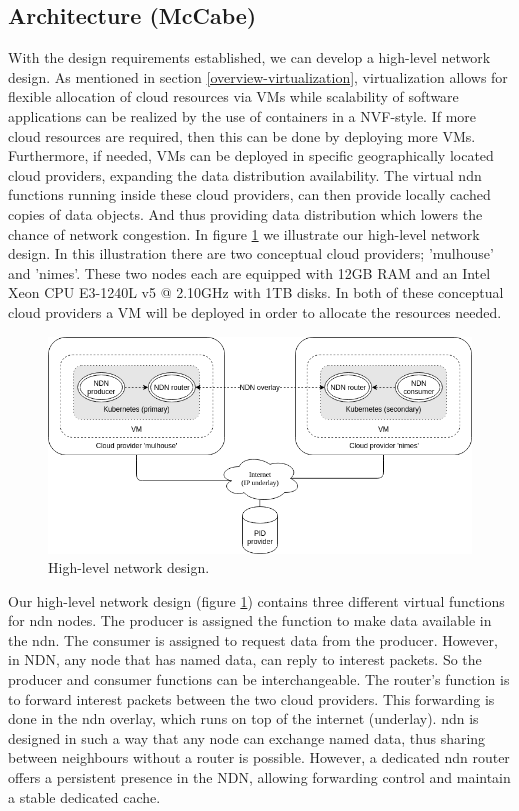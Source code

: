 \subsection{Architecture (McCabe)}
\label{planning-architecture}
With the design requirements established, we can develop a high-level network design. As mentioned in section \ref{overview-virtualization}, virtualization allows for flexible allocation of cloud resources via VMs while scalability of software applications can be realized by the use of containers in a NVF-style. If more cloud resources are required, then this can be done by deploying more VMs. Furthermore, if needed, VMs can be deployed in specific geographically located cloud providers, expanding the data distribution availability. The virtual \gls{ndn} functions running inside these cloud providers, can then provide locally cached copies of data objects. And thus providing data distribution which lowers the chance of network congestion. In figure \ref{fig:high-level-network-design} we illustrate our high-level network design. In this illustration there are two conceptual cloud providers; 'mulhouse' and 'nimes'. These two nodes each are equipped with 12GB RAM and an Intel Xeon CPU E3-1240L v5 @ 2.10GHz with 1TB disks. In both of these conceptual cloud providers a VM will be deployed in order to allocate the resources needed.

\begin{figure}[H]
\centering
\includegraphics[width=\columnwidth]{Images/high-level-network-design.png}
\caption{High-level network design.}
\label{fig:high-level-network-design}
\end{figure}

Our high-level network design (figure \ref{fig:high-level-network-design}) contains three different virtual functions for \gls{ndn} nodes. The producer is assigned the function to make data available in the \gls{ndn}. The consumer is assigned to request data from the producer. However, in NDN, any node that has named data, can reply to interest packets. So the producer and consumer functions can be interchangeable. The router's function is to forward interest packets between the two cloud providers. This forwarding is done in the \gls{ndn} overlay, which runs on top of the internet (underlay). \gls{ndn} is designed in such a way that any node can exchange named data, thus sharing between neighbours without a router is possible. However, a dedicated \gls{ndn} router offers a persistent presence in the NDN, allowing forwarding control and maintain a stable dedicated cache.

